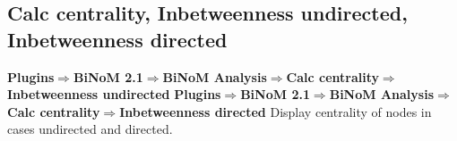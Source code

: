\subsection{Calc centrality, Inbetweenness undirected, Inbetweenness directed}
\textbf{Plugins$\Rightarrow$BiNoM 2.1$\Rightarrow$BiNoM Analysis$\Rightarrow$Calc centrality$\Rightarrow$Inbetweenness undirected}
\textbf{Plugins$\Rightarrow$BiNoM 2.1$\Rightarrow$BiNoM Analysis$\Rightarrow$Calc centrality$\Rightarrow$Inbetweenness directed}
Display centrality of nodes in cases undirected and directed.


